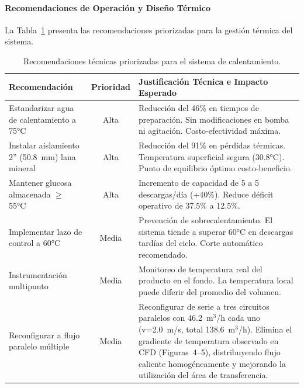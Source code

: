 \paragraph{Recomendaciones de Operación y Diseño Térmico}

La Tabla~\ref{tab:resumen_recomendaciones_termicas} presenta las recomendaciones priorizadas para la gestión térmica del sistema.

\begin{table}[H]
\centering
\caption{Recomendaciones técnicas priorizadas para el sistema de calentamiento.}
\label{tab:resumen_recomendaciones_termicas}
\setcounter{itemcount}{0}
\begin{tabularx}{\textwidth}{@{}lcX@{}}
\toprule
\textbf{Recomendación} & \textbf{Prioridad} & \textbf{Justificación Técnica e Impacto Esperado} \\
\midrule
Estandarizar agua de calentamiento a 75°C & Alta & Reducción del 46\% en tiempos de preparación. Sin modificaciones en bomba ni agitación. Costo-efectividad máxima. \\
\midrule
Instalar aislamiento 2'' (50.8~mm) lana mineral & Alta & Reducción del 91\% en pérdidas térmicas. Temperatura superficial segura (30.8°C). Punto de equilibrio óptimo costo-beneficio. \\
\midrule
Mantener glucosa almacenada $\geq$ 55°C & Alta & Incremento de capacidad de 5 a 5 descargas/día (+40\%). Reduce déficit operativo de 37.5\% a 12.5\%. \\
\midrule
Implementar lazo de control a 60°C & Media & Prevención de sobrecalentamiento. El sistema tiende a superar 60°C en descargas tardías del ciclo. Corte automático recomendado. \\
\midrule
Instrumentación multipunto & Media & Monitoreo de temperatura real del producto en el fondo. La temperatura local puede diferir del promedio del volumen. \\
\midrule
Reconfigurar a flujo paralelo múltiple & Media & Reconfigurar de serie a tres circuitos paralelos con 46.2~m$^3$/h cada uno (v=2.0~m/s, total 138.6~m$^3$/h). Elimina el gradiente de temperatura observado en CFD (Figuras~4--5), distribuyendo flujo caliente homogéneamente y mejorando la utilización del área de transferencia. \\
\bottomrule
\end{tabularx}
\end{table}


